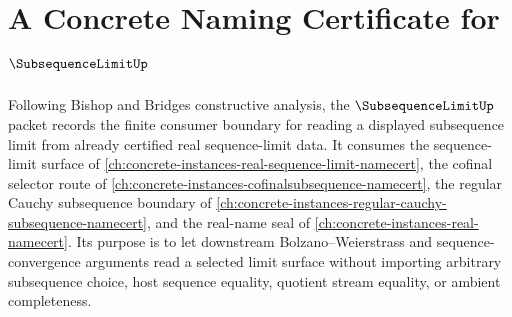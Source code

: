 \chapter{A Concrete Naming Certificate for $\SubsequenceLimitUp$}
\label{ch:concrete-instances-subsequence-limit-namecert}

Following Bishop and Bridges constructive analysis, the $\SubsequenceLimitUp$ packet records the finite consumer boundary for reading a displayed subsequence limit from already certified real sequence-limit data. It consumes the sequence-limit surface of \autoref{ch:concrete-instances-real-sequence-limit-namecert}, the cofinal selector route of \autoref{ch:concrete-instances-cofinalsubsequence-namecert}, the regular Cauchy subsequence boundary of \autoref{ch:concrete-instances-regular-cauchy-subsequence-namecert}, and the real-name seal of \autoref{ch:concrete-instances-real-namecert}. Its purpose is to let downstream Bolzano--Weierstrass and sequence-convergence arguments read a selected limit surface without importing arbitrary subsequence choice, host sequence equality, quotient stream equality, or ambient completeness.

